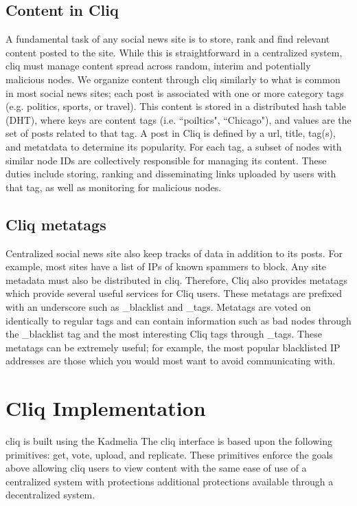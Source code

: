 \documentclass{sig-alternate}
\begin{document}
\subsection{Content in Cliq}
A fundamental task of any social news site is to store, rank and find relevant content posted to the site. While this is straightforward in a centralized system, cliq must manage content spread across random, interim and potentially malicious nodes.
We organize content through cliq similarly to what is common in most social news sites; each 
post is associated with one or more category tags (e.g. politics, sports, or travel). 
This content is stored in a distributed hash table (DHT), where keys are content tags (i.e. ``poiltics", ``Chicago"), and values are the set of posts related to that tag. A post in Cliq is defined by a url, title, tag(s), and metatdata to determine its popularity. For each tag, a subset of nodes with similar node IDs are collectively responsible for managing its content. These duties include storing, ranking and disseminating links uploaded by users with that tag, as well as monitoring for malicious nodes.

\subsection{Cliq metatags}

Centralized social news site also keep tracks of data in addition to its posts. For example, most sites have a list of IPs of known spammers to block. Any site metadata must also be distributed in cliq. Therefore, Cliq also provides metatags which provide several useful services for Cliq users. These metatags are prefixed with an underscore such as \_blacklist and \_tags. 
Metatags are voted on identically to regular tags and can contain information such as bad nodes through the \_blacklist tag and the most interesting Cliq tags through \_tags. 
These metatags can be extremely useful; for example, the most popular blacklisted IP addresses are those which you would most want to avoid communicating with. 

\section{Cliq Implementation}

cliq is built using the Kadmelia The cliq interface is based upon the following primitives: get, vote, upload, and replicate. 
These primitives enforce the goals above allowing cliq users to view content with the same ease of use of a centralized system with protections additional protections available through a decentralized system. 
\end{document}
